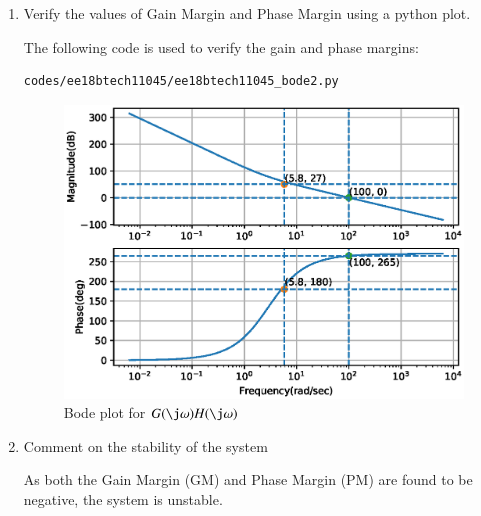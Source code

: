 \begin{enumerate}[label=\thesubsection.\arabic*.,ref=\thesubsection.\theenumi]
\item Verify the values of Gain Margin and Phase Margin using a python plot.

\solution

The following code is used to verify the gain and phase margins:
\begin{lstlisting}
codes/ee18btech11045/ee18btech11045_bode2.py
\end{lstlisting}

\begin{figure}[!ht]
\centering
\includegraphics[width=\columnwidth]{./figs/ee18btech11045/ee18btech11045_bode2.eps}
\caption{Bode plot for $G(\j\omega)H(\j\omega)$}
\label{fig:ee18btech11045_bode2}
\end{figure}


\item Comment on the stability of the system

\solution

As both the Gain Margin (GM) and Phase Margin (PM) are found to be negative, the system is unstable.
\end{enumerate}